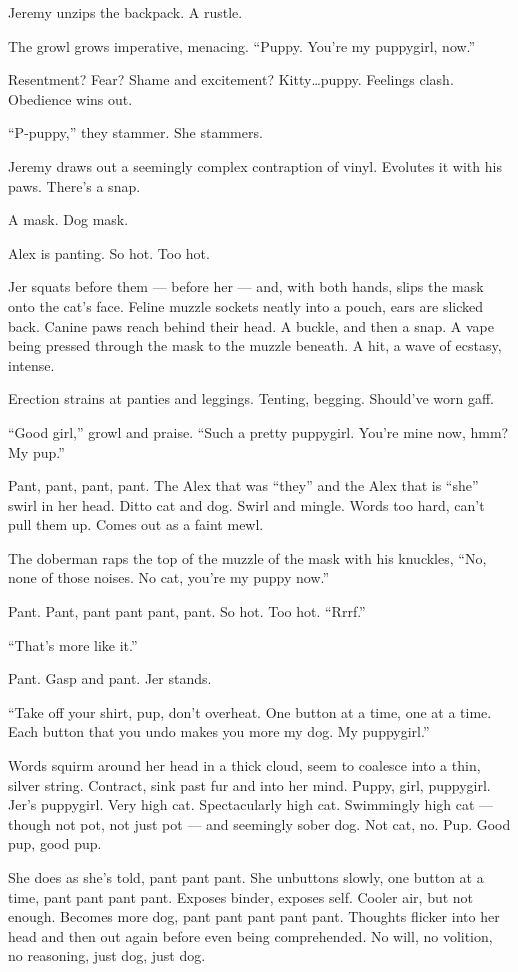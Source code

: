 Jeremy unzips the backpack. A rustle.

The growl grows imperative, menacing. ``Puppy. You're my puppygirl, now.''

Resentment? Fear? Shame and excitement? Kitty\ldots{}puppy. Feelings clash. Obedience wins out.

``P-puppy,'' they stammer. She stammers.

Jeremy draws out a seemingly complex contraption of vinyl. Evolutes it with his paws. There's a snap.

A mask. Dog mask.

Alex is panting. So hot. Too hot.

Jer squats before them --- before her --- and, with both hands, slips the mask onto the cat's face. Feline muzzle sockets neatly into a pouch, ears are slicked back. Canine paws reach behind their head. A buckle, and then a snap. A vape being pressed through the mask to the muzzle beneath. A hit, a wave of ecstasy, intense.

Erection strains at panties and leggings. Tenting, begging. Should've worn gaff.

``Good girl,'' growl and praise. ``Such a pretty puppygirl. You're mine now, hmm? My pup.''

Pant, pant, pant, pant. The Alex that was ``they'' and the Alex that is ``she'' swirl in her head. Ditto cat and dog. Swirl and mingle. Words too hard, can't pull them up. Comes out as a faint mewl.

The doberman raps the top of the muzzle of the mask with his knuckles, ``No, none of those noises. No cat, you're my puppy now.''

Pant. Pant, pant pant pant, pant. So hot. Too hot. ``Rrrf.''

``That's more like it.''

Pant. Gasp and pant. Jer stands.

``Take off your shirt, pup, don't overheat. One button at a time, one at a time. Each button that you undo makes you more my dog. My puppygirl.''

Words squirm around her head in a thick cloud, seem to coalesce into a thin, silver string. Contract, sink past fur and into her mind. Puppy, girl, puppygirl. Jer's puppygirl. Very high cat. Spectacularly high cat. Swimmingly high cat --- though not pot, not just pot --- and seemingly sober dog. Not cat, no. Pup. Good pup, good pup.

She does as she's told, pant pant pant. She unbuttons slowly, one button at a time, pant pant pant pant. Exposes binder, exposes self. Cooler air, but not enough. Becomes more dog, pant pant pant pant pant. Thoughts flicker into her head and then out again before even being comprehended. No will, no volition, no reasoning, just dog, just dog.


